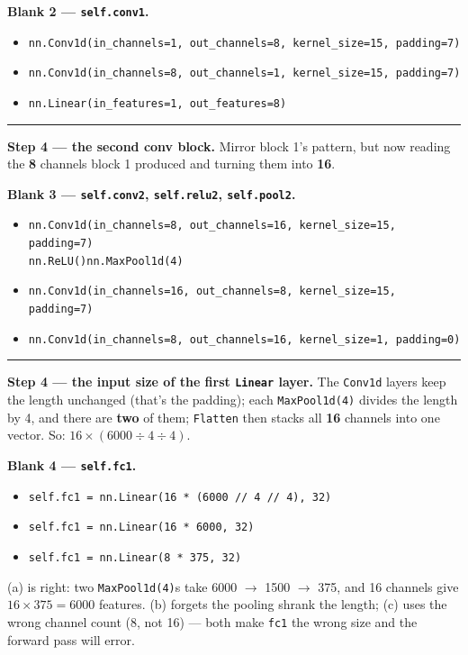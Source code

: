 \documentclass[11pt]{article}
\newcommand{\opt}[1]{\texttt{#1}}
\begin{document}
\textbf{Blank 2 --- \texttt{self.conv1}.}
\begin{itemize}
  \item[(a)] \opt{nn.Conv1d(in\_channels=1, out\_channels=8, kernel\_size=15, padding=7)}
  \item[(b)] \opt{nn.Conv1d(in\_channels=8, out\_channels=1, kernel\_size=15, padding=7)}
  \item[(c)] \opt{nn.Linear(in\_features=1, out\_features=8)}
\end{itemize}

\vspace{3pt}\hrule\vspace{4pt}

\textbf{Step 4 --- the second conv block.}\; {\small Mirror block 1's pattern, but now reading
the \textbf{8} channels block 1 produced and turning them into \textbf{16}.}

\textbf{Blank 3 --- \texttt{self.conv2}, \texttt{self.relu2}, \texttt{self.pool2}.}
\begin{itemize}
  \item[(a)] \opt{nn.Conv1d(in\_channels=8, out\_channels=16, kernel\_size=15, padding=7)}\\
    \hspace{1.4em}{\small then, same as block 1:}\quad\opt{nn.ReLU()}\quad\opt{nn.MaxPool1d(4)}
  \item[(b)] \opt{nn.Conv1d(in\_channels=16, out\_channels=8, kernel\_size=15, padding=7)}
  \item[(c)] \opt{nn.Conv1d(in\_channels=8, out\_channels=16, kernel\_size=1, padding=0)}
\end{itemize}

\vspace{3pt}\hrule\vspace{4pt}

\textbf{Step 4 --- the input size of the first \texttt{Linear} layer.}\; {\small The \texttt{Conv1d}
layers keep the length unchanged (that's the padding); each \texttt{MaxPool1d(4)} divides the length
by 4, and there are \textbf{two} of them; \texttt{Flatten} then stacks all \textbf{16} channels into
one vector. So: $16 \times (6000 \div 4 \div 4)$.}

\textbf{Blank 4 --- \texttt{self.fc1}.}
\begin{itemize}
  \item[(a)] \opt{self.fc1 = nn.Linear(16 * (6000 // 4 // 4), 32)}
  \item[(b)] \opt{self.fc1 = nn.Linear(16 * 6000, 32)}
  \item[(c)] \opt{self.fc1 = nn.Linear(8 * 375, 32)}
\end{itemize}
{\small (a) is right: two \texttt{MaxPool1d(4)}s take 6000 $\to$ 1500 $\to$ 375, and 16 channels give
$16 \times 375 = 6000$ features. (b) forgets the pooling shrank the length; (c) uses the wrong channel
count (8, not 16) --- both make \texttt{fc1} the wrong size and the forward pass will error.}
\end{document}

